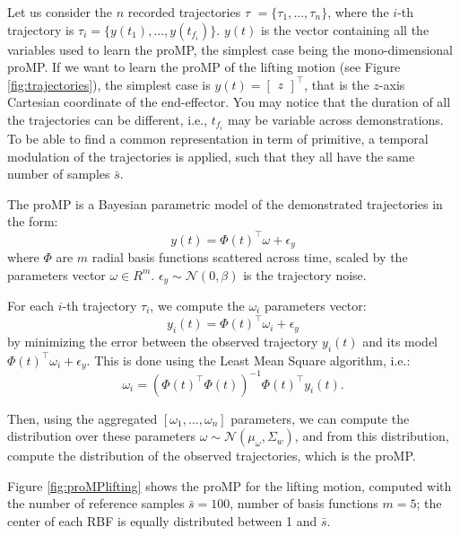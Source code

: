Let us consider the $n$ recorded trajectories \textcircled{$ \tau$} $= \{\tau_1,..., \tau_n \}$, where  the $i$-th trajectory is $\tau_i = \{y(t_1), ..., y(t_{f_i})\}$. 
$y(t)$ is the vector containing all the variables used to learn the proMP, the simplest case being the mono-dimensional proMP. If we want to learn the proMP of the lifting motion (see Figure \ref{fig:trajectories}), the simplest case is $y(t) =\begin{bmatrix} z\end{bmatrix}^{\top}$, that is the $z$-axis Cartesian coordinate of the end-effector. You may notice that the duration of all the trajectories can be different, i.e.,  $t_{f_i}$ may be variable across demonstrations. 
To be able to find a common representation in term of primitive, a temporal modulation of the trajectories is applied, such that they all have the same number of samples $\bar{s}$. 

The proMP is a Bayesian parametric model of the demonstrated trajectories in the form: 
$$y(t) = \Phi(t)^\top \omega + \epsilon_y$$ 
where $\Phi$ are $m$ radial basis functions scattered across time, scaled by the parameters vector $\omega \in R^m$. 
$\epsilon_y \sim \mathcal{N}(0, \beta) $ is the trajectory noise. 

For each $i$-th trajectory $\tau_i$, we compute the $\omega_i$ parameters vector:
$$y_i(t) = \Phi(t)^\top \omega_i + \epsilon_y$$ 
by minimizing the error between the observed trajectory $y_i(t)$ and its model $\Phi(t)^\top \omega_i + \epsilon_y$. This is done using the Least Mean Square algorithm, i.e.:
$$ \omega_i = (\Phi(t)^\top\Phi(t))^{-1}\Phi(t)^\top y_i(t).$$

Then, using the aggregated $[\omega_1,..., \omega_n]$ parameters, we can compute the distribution over these parameters $\omega \sim \mathcal{N}(\mu_\omega, \Sigma_w)$, and from this distribution, compute the distribution of the observed trajectories, which is the proMP.

Figure \ref{fig:proMPlifting} shows the proMP for the lifting motion, computed with the number of reference samples $\bar{s}=100$, number of basis functions $m=5$; the center of each RBF is equally distributed between 1 and $\bar{s}$.


